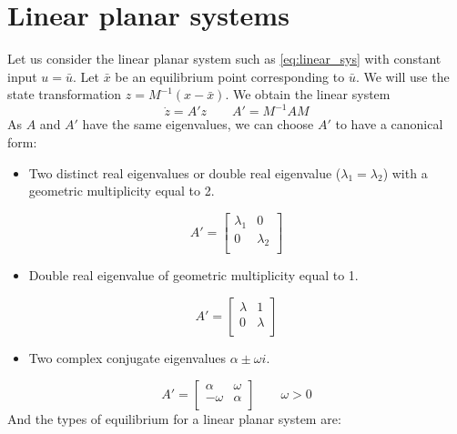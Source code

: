 \documentclass[12pt, openany]{report}
\theoremstyle{definition}
\begin{document}
\section{Linear planar systems}
Let us consider the linear planar system such as \eqref{eq:linear_sys} with constant input \(u=\bar u\). Let \(\bar x\) be an equilibrium point corresponding to \(\bar u\). We will use the state transformation \(z=M^{-1}(x-\bar x)\). We obtain the linear system
\begin{equation}
    \dot z = A'z\qquad A' = M^{-1}AM
\end{equation}
As \(A\) and \(A'\) have the same eigenvalues, we can choose \(A'\) to have a canonical form:
\begin{itemize}
    \item Two distinct real eigenvalues or double real eigenvalue (\(\lambda_1=\lambda_2\)) with a geometric multiplicity equal to 2.
\end{itemize}
\begin{equation}
    A' = \begin{bmatrix}
        \lambda_1 & 0\\
        0 & \lambda_2\\
    \end{bmatrix}
\end{equation}
\begin{itemize}
    \item Double real eigenvalue of geometric multiplicity equal to 1.
\end{itemize}
\begin{equation}
    A' = \begin{bmatrix}
        \lambda & 1\\
        0 & \lambda\\
    \end{bmatrix}
\end{equation}
\begin{itemize}
    \item Two complex conjugate eigenvalues \(\alpha \pm \omega i\).
\end{itemize}
\begin{equation}
    A' = \begin{bmatrix}
        \alpha & \omega\\
        -\omega & \alpha\\
    \end{bmatrix} \qquad \omega >0
\end{equation}
And the types of equilibrium for a linear planar system are:
\end{document}
